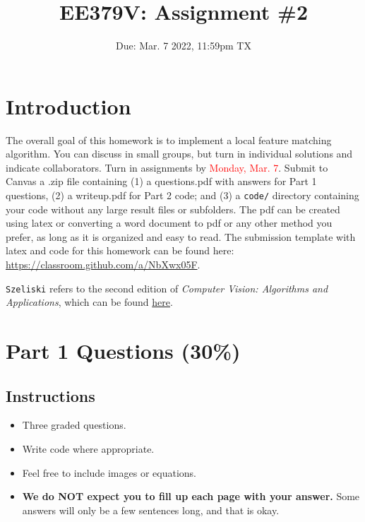 \documentclass{article}
\title{EE379V: Assignment \#2}
\date{Due: Mar. 7 2022, 11:59pm TX}
\begin{document}
\maketitle


\section*{Introduction}

The overall goal of this homework is to implement a local feature matching algorithm. You can discuss in small groups, but turn in individual solutions and indicate collaborators. Turn in assignments by \textcolor{red}{Monday, Mar. 7}. Submit to Canvas a .zip file containing  (1) a questions.pdf with answers for Part 1 questions, (2) a writeup.pdf for Part 2 code; and (3) a \texttt{code/} directory containing your code without any large result files or subfolders. The pdf can be created using latex or converting a word document to pdf or any other method you prefer, as long as it is organized and easy to read. The submission template with latex and code for this homework can be found here: \href{https://classroom.github.com/a/NbXwx05F}{https://classroom.github.com/a/NbXwx05F}.



\begin{info}
	\texttt{Szeliski} refers to the second edition of \textit{Computer Vision: Algorithms and Applications}, which can be found \href{http://szeliski.org/Book/}{here}.
\end{info}


\section{Part 1 Questions (30\%)}

\subsection*{Instructions}

\begin{itemize}
    \item Three graded questions.
    \item Write code where appropriate.
    \item Feel free to include images or equations.
    \item \textbf{We do NOT expect you to fill up each page with your answer.} Some answers will only be a few sentences long, and that is okay.
  \end{itemize}
\end{document}
